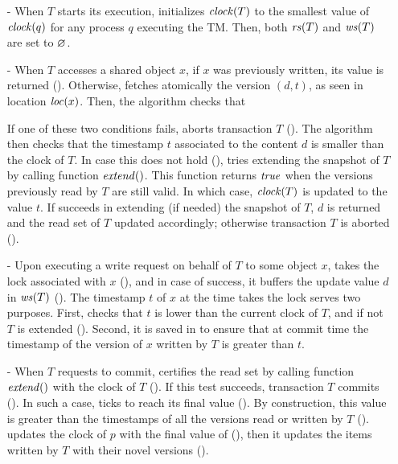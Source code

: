 \begin{itemize}
\item[-] %
  When $T$ starts its execution,  initializes $\clockOf{T}$ to the smallest value of $\clockOf{q}$ for any process $q$ executing the TM.
  Then, both $\readSetOf{T}$ and $\writeSetOf{T}$ are set to $\emptySet$.
\item[-] %
  When $T$ accesses a shared object $x$, if $x$ was previously written, its value is returned ().
  Otherwise,  fetches atomically the version $(d,t)$, as seen in location $\locationOf{x}$.
  Then, the algorithm checks that 
  If one of these two conditions fails,  aborts transaction $T$ ().
  The algorithm then checks that the timestamp $t$ associated to the content $d$ is smaller than the clock of $T$.
  In case this does not hold (),  tries extending the snapshot of $T$ by calling function $\stmExtend{}$.
  This function returns $\true$ when the versions previously read by $T$ are still valid.
  In which case, $\clockOf{T}$ is updated to the value $t$.
  If  succeeds in extending (if needed) the snapshot of $T$, $d$ is returned and the read set of $T$ updated accordingly;
  otherwise transaction $T$ is aborted ().
\item[-] %
  Upon executing a write request on behalf of $T$ to some object $x$,  takes the lock associated with $x$ (), and in case of success, it buffers the update value $d$ in $\writeSetOf{T}$ ().
  The timestamp $t$ of $x$ at the time  takes the lock serves two purposes.
  First,  checks that $t$ is lower than the current clock of $T$, and if not $T$ is extended ().
  Second, it is saved in  to ensure that at commit time the timestamp of the version of $x$ written by $T$ is greater than $t$.
\item[-] %
  When $T$ requests to commit,  certifies the read set by calling function $\stmExtend{}$ with the clock of $T$ ().
  If this test succeeds, transaction $T$ commits ().
  In such a case,  ticks to reach its final value ().
  By construction, this value is greater than the timestamps of all the versions read or written by $T$ ().
   updates the clock of $p$ with the final value of  (), then it updates the items written by $T$ with their novel versions ().
\end{itemize}

